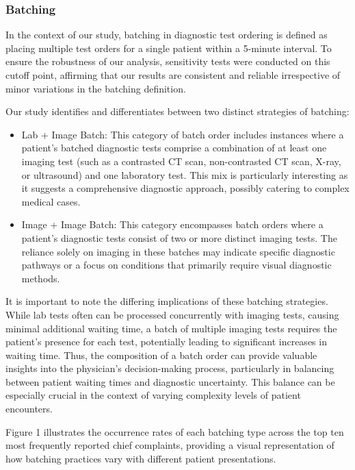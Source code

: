 \documentclass[,,nonblindrev]{informs}
\begin{document}
\hypertarget{batching}{%
\subsubsection{Batching}\label{batching}}

In the context of our study, batching in diagnostic test ordering is
defined as placing multiple test orders for a single patient within a
5-minute interval. To ensure the robustness of our analysis, sensitivity
tests were conducted on this cutoff point, affirming that our results
are consistent and reliable irrespective of minor variations in the
batching definition.

Our study identifies and differentiates between two distinct strategies
of batching:

\begin{itemize}
\item
  Lab + Image Batch: This category of batch order includes instances
  where a patient's batched diagnostic tests comprise a combination of
  at least one imaging test (such as a contrasted CT scan,
  non-contrasted CT scan, X-ray, or ultrasound) and one laboratory test.
  This mix is particularly interesting as it suggests a comprehensive
  diagnostic approach, possibly catering to complex medical cases.
\item
  Image + Image Batch: This category encompasses batch orders where a
  patient's diagnostic tests consist of two or more distinct imaging
  tests. The reliance solely on imaging in these batches may indicate
  specific diagnostic pathways or a focus on conditions that primarily
  require visual diagnostic methods.
\end{itemize}

It is important to note the differing implications of these batching
strategies. While lab tests often can be processed concurrently with
imaging tests, causing minimal additional waiting time, a batch of
multiple imaging tests requires the patient's presence for each test,
potentially leading to significant increases in waiting time. Thus, the
composition of a batch order can provide valuable insights into the
physician's decision-making process, particularly in balancing between
patient waiting times and diagnostic uncertainty. This balance can be
especially crucial in the context of varying complexity levels of
patient encounters.

Figure 1 illustrates the occurrence rates of each batching type across
the top ten most frequently reported chief complaints, providing a
visual representation of how batching practices vary with different
patient presentations.
\end{document}

